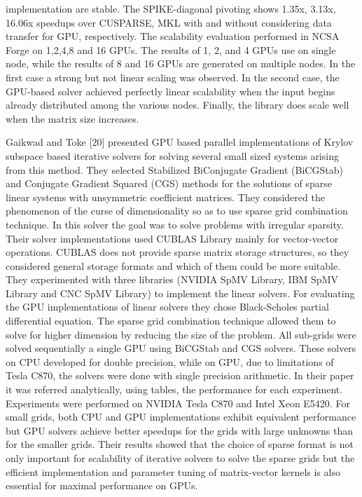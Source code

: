 implementation are stable. The SPIKE-diagonal pivoting shows 1.35x, 3.13x, 16.06x speedups over CUSPARSE, MKL with and without considering data transfer for GPU, respectively. The scalability evaluation performed in NCSA Forge on 1,2,4,8 and 16 GPUs. The results of 1, 2, and 4 GPUs use on single node, while the results of 8 and 16 GPUs are generated on multiple nodes. In the first case a strong but not linear scaling was observed. In the second case, the GPU-based solver achieved perfectly linear scalability when the input begins already distributed among the various nodes. Finally, the library does scale well when the matrix size increases.

Gaikwad and Toke [20] presented GPU based parallel implementations of Krylov subspace based iterative solvers for solving several small sized systems arising from this method. They selected Stabilized BiConjugate Gradient (BiCGStab) and Conjugate Gradient Squared (CGS) methods for the solutions of sparse linear systems with unsymmetric coefficient matrices. They considered the phenomenon of the curse of dimensionality so as to use sparse grid combination technique. In this solver the goal was to solve problems with irregular sparsity. Their solver implementations used CUBLAS Library mainly for vector-vector operations. CUBLAS does not provide sparse matrix storage structures, so they considered general storage formats and which of them could be more suitable. They experimented with three libraries (NVIDIA SpMV Library, IBM SpMV Library and CNC SpMV Library) to implement the linear solvers. For evaluating the GPU implementations of linear solvers they chose Black-Scholes partial differential equation. The sparse grid combination technique allowed them to solve for higher dimension by reducing the size of the problem. All sub-grids were solved sequentially a single GPU using BiCGStab and CGS solvers. These solvers on CPU developed for double precision, while on GPU, due to limitations of Tesla C870, the solvers were done with single precision arithmetic. In their paper it was referred analytically, using tables, the performance for each experiment. Experiments were performed on NVIDIA Tesla C870 and Intel Xeon E5420. For small grids, both CPU and GPU implementations exhibit equivalent performance but GPU solvers achieve better speedups for the grids with large unknowns than for the smaller grids. Their results showed that the choice of sparse format is not only important for scalability of iterative solvers to solve the sparse grids but the efficient implementation and parameter tuning of matrix-vector kernels is also essential for maximal performance on GPUs.

